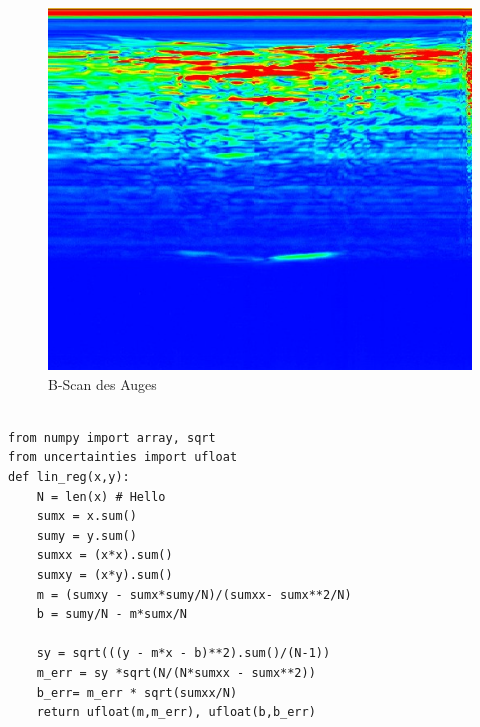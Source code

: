 \documentclass[11pt,ngerman,a4paper]{article}
\begin{document}
\begin{figure}[h]
\includegraphics[width=12cm]{bscan2.jpg}
\caption{B-Scan des Auges}
\label{fig4}
\end{figure}

\begin{lstlisting}[captionpos=b,caption=Quellcode \texttt{lin\_reg()}-Funktion]

from numpy import array, sqrt
from uncertainties import ufloat
def lin_reg(x,y):
    N = len(x) # Hello
    sumx = x.sum()
    sumy = y.sum()
    sumxx = (x*x).sum()
    sumxy = (x*y).sum()
    m = (sumxy - sumx*sumy/N)/(sumxx- sumx**2/N)
    b = sumy/N - m*sumx/N
    
    sy = sqrt(((y - m*x - b)**2).sum()/(N-1))
    m_err = sy *sqrt(N/(N*sumxx - sumx**2))
    b_err= m_err * sqrt(sumxx/N)
    return ufloat(m,m_err), ufloat(b,b_err)

\end{lstlisting}
\newpage

\end{document}
